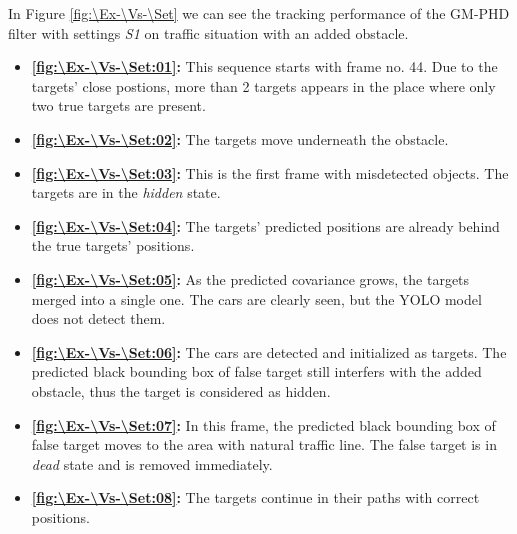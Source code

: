 In Figure \ref{fig:\Ex-\Vs-\Set} we can see the tracking performance of the GM-PHD filter with settings \textit{S1} on traffic situation with an added obstacle.
\begin{itemize}
    \item \textbf{\ref{fig:\Ex-\Vs-\Set:01}:} This sequence starts with frame no. 44. Due to the targets' close postions, more than 2 targets appears in the place where only two true targets are present.
    \item \textbf{\ref{fig:\Ex-\Vs-\Set:02}:} The targets move underneath the obstacle.
    \item \textbf{\ref{fig:\Ex-\Vs-\Set:03}:} This is the first frame with misdetected objects. The targets are in the \textit{hidden} state.
    \item \textbf{\ref{fig:\Ex-\Vs-\Set:04}:} The targets' predicted positions are already behind the true targets' positions.
    \item \textbf{\ref{fig:\Ex-\Vs-\Set:05}:} As the predicted covariance grows, the targets merged into a single one. The cars are clearly seen, but the YOLO model does not detect them.
    \item \textbf{\ref{fig:\Ex-\Vs-\Set:06}:} The cars are detected and initialized as targets. The predicted black bounding box of false target still interfers with the added obstacle, thus the target is considered as hidden.
    \item \textbf{\ref{fig:\Ex-\Vs-\Set:07}:} In this frame, the predicted black bounding box of false target moves to the area with natural traffic line. The false target is in \textit{dead} state and is removed immediately.
    \item \textbf{\ref{fig:\Ex-\Vs-\Set:08}:} The targets continue in their paths with correct positions.
\end{itemize}

